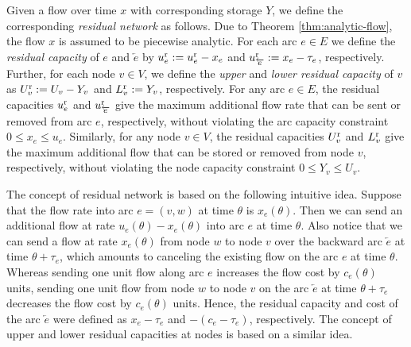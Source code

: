 \documentclass{svjour3}                     \smartqed
\begin{document}
Given a flow over time $x$ with corresponding storage $Y$, we define the corresponding \emph{residual network} as follows. Due to Theorem \ref{thm:analytic-flow}, the flow $x$ is assumed to be piecewise analytic.  For each arc $e \in E$ we define the \emph{residual capacity} of $e$ and $\overleftarrow{e}$ by $u^\text r_e := u^\text r_e - x_e$ and $u^\text r_{\overleftarrow{e}} := x_e - \tau_e$, respectively. Further, for each node $v \in V$, we define the \emph{upper} and \emph{lower residual capacity} of $v$ as $U^\text r_v := U_v - Y_v$ and $L^\text r_v:= Y_v$, respectively.  For any arc $e\in E$, the residual capacities $u^\text r_e$ and $u^\text r_{\overleftarrow{e}}$ give the maximum additional flow rate that can be sent or removed from arc $e$, respectively, without violating the arc capacity constraint $0\leq x_e\leq u_e$.  Similarly, for any node $v\in V$, the residual capacities $U^\text r_v$ and $L^\text r_v$ give the maximum additional flow that can be stored or removed from node $v$, respectively, without violating the node capacity constraint $0\leq Y_v\leq U_v$.


The concept of residual network is based on the following intuitive idea. Suppose that the flow rate into arc $e=(v,w)$ at time $\theta$ is $x_e(\theta)$. Then we can send an additional flow at rate $u_e(\theta)-x_e(\theta)$ into arc $e$ at time $\theta$. Also notice that we can send a flow at rate
$x_e(\theta)$ from node $w$ to node $v$ over the backward arc $\overleftarrow{e}$ at time $\theta+\tau_e$, which amounts to
canceling the existing flow on the arc $e$ at time $\theta$. Whereas sending one unit flow along arc $e$ increases the flow cost by $c_{e}(\theta)$ units, sending one unit flow from node $w$ to
node $v$ on the arc $\overleftarrow{e}$ at time $\theta+\tau_e$ decreases the flow cost by $c_{e}(\theta)$ units. Hence, the residual capacity and cost of the arc $\overleftarrow{e}$ were defined as $x_e-\tau_e$ and $-(c_e-\tau_e)$, respectively. The concept of upper and lower residual capacities at nodes is based on a similar idea.
\end{document}
